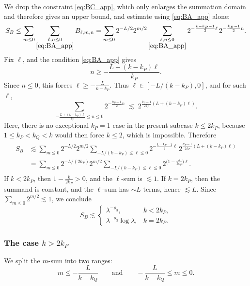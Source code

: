 \documentclass[10pt]{amsart}
\numberwithin{equation}{section}
\theoremstyle{definition}
\theoremstyle{remark}
\theoremstyle{remark}
\begin{document}
	We drop the constraint \eqref{eq:BC_app}, which only enlarges the summation domain and therefore gives an upper bound, and estimate using \eqref{eq:BA_app} alone:
	\[
	S_B\le \sum_{m\le 0}\sum_{\substack{\ell,n\le 0\\ \eqref{eq:BA_app}}}B_{\ell,m,n}
	=
	\sum_{m\le 0}2^{-L/2}2^{m/2}
	\sum_{\substack{\ell,n\le 0\\ \eqref{eq:BA_app}}}
	2^{-\frac{k-k_P-1}{2}\ell}\,2^{-\frac{k_P-1}{2}n}.
	\]
	Fix $\ell$, and the condition \eqref{eq:BA_app} gives
	\[
	n\ge -\frac{L+(k-k_P)\ell}{k_P}.
	\]
	Since $n\le 0$, this forces $\ell\ge -\frac{L}{k-k_P}$. Thus $\ell\in[-L/(k-k_P),0]$, and for such $\ell$,
	\[
	\sum_{-\frac{L+(k-k_P)\ell}{k_P}\le n\le 0}
	2^{-\frac{k_P-1}{2}n}
	\;\lesssim\;
	2^{\frac{k_P-1}{2k_P}(L+(k-k_P)\ell)}.
	\]
		Here, there is no exceptional \(k_P=1\) case in the present subcase \(k\le 2k_P\), because \(1\le k_P<k_Q<k\) would then force \(k\le2\), which is impossible.
	Therefore
	\begin{align}\label{eq:SB}
    \begin{split}
		S_B
		&\lesssim
		\sum_{m\le 0}2^{-L/2}2^{m/2}
		\sum_{-L/(k-k_P)\le \ell\le 0}
		2^{-\frac{k-k_P-1}{2}\ell}\,
		2^{\frac{k_P-1}{2k_P}(L+(k-k_P)\ell)}\\
		&=
		\sum_{m\le 0}
		2^{-L/(2k_P)}2^{m/2}
		\sum_{-L/(k-k_P)\le \ell\le 0}
		2^{\bigl(1-\frac{k}{2k_P}\bigr)\ell}.
    \end{split}
	\end{align}
	If $k<2k_P$, then $1-\frac{k}{2k_P}>0$, and the $\ell$-sum is $\lesssim 1$.
	If $k=2k_P$, then the summand is constant, and the $\ell$-sum has $\sim L$ terms, hence $\lesssim L$.
	Since $\sum_{m\le 0}2^{m/2}\lesssim 1$, we conclude
	\begin{equation}\label{eq:SB_kle2kP}
		S_B\lesssim
		\begin{cases}
			\lambda^{-\rho_3},&k<2k_P,\\
			\lambda^{-\rho_3}\log\lambda,&k=2k_P.
		\end{cases}
	\end{equation}
	
	\subsubsection{The case $k>2k_P$}
	
	We split the $m$-sum into two ranges:
	\[
	m\le -\frac{L}{k-k_Q}
	\qquad\text{and}\qquad
	-\frac{L}{k-k_Q}\le m\le 0.
	\]
	
\end{document}
